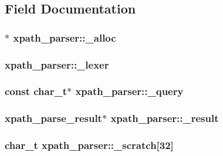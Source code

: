 \subsection{Field Documentation}
\hypertarget{structxpath__parser_ac34f5b21ef406bec944286eee2f45836}{
\subsubsection[{\-\_\-alloc}]{$\ast$ xpath\-\_\-parser\-::\-\_\-alloc}}\label{structxpath__parser_ac34f5b21ef406bec944286eee2f45836}
\hypertarget{structxpath__parser_a50106db584946e67acd080ef5391a0f4}{
\subsubsection[{\-\_\-lexer}]{ xpath\-\_\-parser\-::\-\_\-lexer}}\label{structxpath__parser_a50106db584946e67acd080ef5391a0f4}
\hypertarget{structxpath__parser_aaf5ea5d5be97cdd93adc7a719d8edc1c}{
\subsubsection[{\-\_\-query}]{\setlength{\rightskip}{0pt plus 5cm}const char\-\_\-t$\ast$ xpath\-\_\-parser\-::\-\_\-query}}\label{structxpath__parser_aaf5ea5d5be97cdd93adc7a719d8edc1c}
\hypertarget{structxpath__parser_a9370fb875bfc49ca6e35f3165ecb1692}{
\subsubsection[{\-\_\-result}]{\setlength{\rightskip}{0pt plus 5cm}xpath\-\_\-parse\-\_\-result$\ast$ xpath\-\_\-parser\-::\-\_\-result}}\label{structxpath__parser_a9370fb875bfc49ca6e35f3165ecb1692}
\hypertarget{structxpath__parser_aa9180a17c8ec28977928c815c3425a79}{
\subsubsection[{\-\_\-scratch}]{\setlength{\rightskip}{0pt plus 5cm}char\-\_\-t xpath\-\_\-parser\-::\-\_\-scratch\mbox{[}32\mbox{]}}}\label{structxpath__parser_aa9180a17c8ec28977928c815c3425a79}
